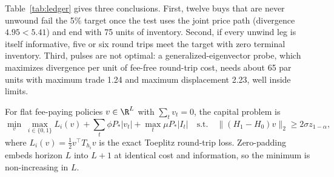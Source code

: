 Table~\ref{tab:ledger} gives three conclusions. First, twelve buys that are never unwound fail the 5\% target once the test uses the joint price path (divergence $4.95<5.41$) and end with 75 units of inventory. Second, if every unwind leg is itself informative, five or six round trips meet the target with zero terminal inventory. Third, pulses are not optimal: a generalized-eigenvector probe, which maximizes divergence per unit of fee-free round-trip cost, needs about 65 par units with maximum trade 1.24 and maximum displacement 2.23, well inside limits.

For flat fee-paying policies $v\in\R^L$ with $\sum_tv_t=0$, the capital problem is
\begin{equation}\label{eq:capprob}
\min_v\ \max_{i\in\{0,1\}}L_i(v)+\sum_t\phi P_*|v_t|+\max_t\mu P_*|I_t|\quad\text{s.t.}\quad\|(H_1-H_0)v\|_2\ge2\sigma z_{1-\alpha},
\end{equation}
where $L_i(v)=\tfrac12v^\top T_{h_i}v$ is the exact Toeplitz round-trip loss. Zero-padding embeds horizon $L$ into $L+1$ at identical cost and information, so the minimum is non-increasing in $L$.

